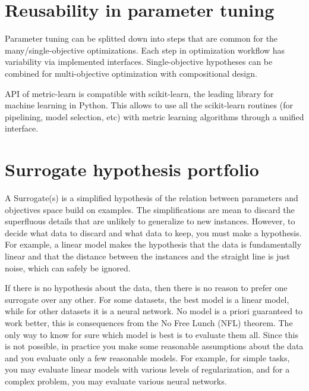 \section{Reusability in parameter tuning}
Parameter tuning can be splitted down into steps that are common for the many/single-objective optimizations. 
Each step in optimization workflow has variability via implemented interfaces.
Single-objective hypotheses can be combined for multi-objective optimization with compositional design.

API of metric-learn is compatible with scikit-learn, the leading library for machine learning in Python. 
This allows to use all the scikit-learn routines (for pipelining, model selection, etc) with metric learning algorithms through a unified interface.


\section{Surrogate hypothesis portfolio}
A Surrogate(s) is a simplified hypothesis of the relation between parameters and objectives space build on examples. The simplifications are mean to discard the superfluous details that are unlikely to generalize to new instances. However, to decide what data to discard and what data to keep, you must make a hypothesis. For example, a linear model makes the hypothesis that the data is fundamentally linear and that the distance between the instances and the straight line is just noise, which can safely be ignored.

If there is no hypothesis about the data, then there is no reason to prefer one surrogate over any other.  For some datasets, the best model is a linear model, while for other datasets it is a neural network. No model is a priori guaranteed to work better, this is consequences from the No Free Lunch (NFL) theorem. The only way to know for sure which model is best is to evaluate them all. Since this is not possible, in practice you make some reasonable assumptions about the data and you evaluate only a few reasonable models. For example, for simple tasks, you may evaluate linear models with various levels of regularization, and for a complex problem, you may evaluate various neural networks.

